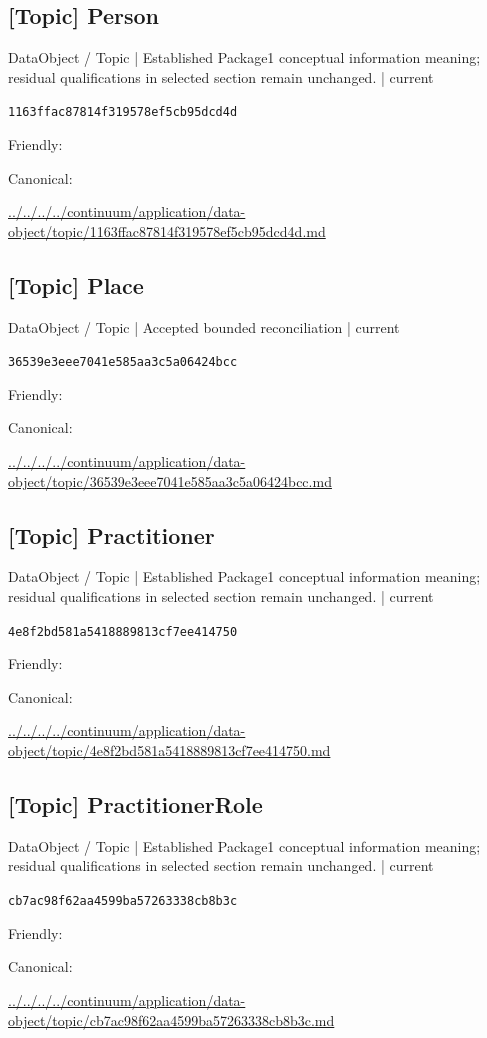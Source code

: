 \documentclass[10pt,a4paper]{article}
\begin{document}
\subsection*{[Topic] Person}
{\small DataObject / Topic | Established Package1 conceptual information meaning; residual qualifications in selected section remain unchanged. | current}\par
\texttt{1163ffac87814f319578ef5cb95dcd4d}\par
Friendly: \par
Canonical: \par
{\footnotesize\url{../../../../continuum/application/data-object/topic/1163ffac87814f319578ef5cb95dcd4d.md}}\par
\subsection*{[Topic] Place}
{\small DataObject / Topic | Accepted bounded reconciliation | current}\par
\texttt{36539e3eee7041e585aa3c5a06424bcc}\par
Friendly: \par
Canonical: \par
{\footnotesize\url{../../../../continuum/application/data-object/topic/36539e3eee7041e585aa3c5a06424bcc.md}}\par
\subsection*{[Topic] Practitioner}
{\small DataObject / Topic | Established Package1 conceptual information meaning; residual qualifications in selected section remain unchanged. | current}\par
\texttt{4e8f2bd581a5418889813cf7ee414750}\par
Friendly: \par
Canonical: \par
{\footnotesize\url{../../../../continuum/application/data-object/topic/4e8f2bd581a5418889813cf7ee414750.md}}\par
\subsection*{[Topic] PractitionerRole}
{\small DataObject / Topic | Established Package1 conceptual information meaning; residual qualifications in selected section remain unchanged. | current}\par
\texttt{cb7ac98f62aa4599ba57263338cb8b3c}\par
Friendly: \par
Canonical: \par
{\footnotesize\url{../../../../continuum/application/data-object/topic/cb7ac98f62aa4599ba57263338cb8b3c.md}}\par
\end{document}
